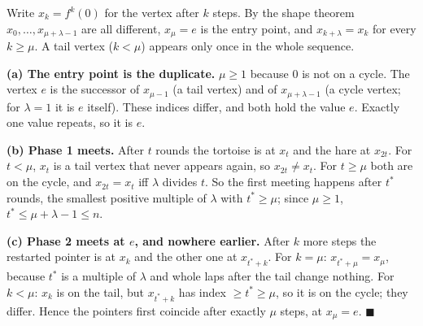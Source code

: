 \begin{invariantbox}
Write $x_k = f^k(0)$ for the vertex after $k$ steps. By the shape theorem $x_0, \dots, x_{\mu+\lambda-1}$ are all different, $x_\mu = e$ is the entry point, and $x_{k+\lambda} = x_k$ for every $k \ge \mu$. A tail vertex ($k < \mu$) appears only once in the whole sequence.

\textbf{(a) The entry point is the duplicate.} $\mu \ge 1$ because $0$ is not on a cycle. The vertex $e$ is the successor of $x_{\mu-1}$ (a tail vertex) and of $x_{\mu+\lambda-1}$ (a cycle vertex; for $\lambda = 1$ it is $e$ itself). These indices differ, and both hold the value $e$. Exactly one value repeats, so it is $e$.

\textbf{(b) Phase 1 meets.} After $t$ rounds the tortoise is at $x_t$ and the hare at $x_{2t}$. For $t < \mu$, $x_t$ is a tail vertex that never appears again, so $x_{2t} \ne x_t$. For $t \ge \mu$ both are on the cycle, and $x_{2t} = x_t$ iff $\lambda$ divides $t$. So the first meeting happens after $t^\ast$ rounds, the smallest positive multiple of $\lambda$ with $t^\ast \ge \mu$; since $\mu \ge 1$, $t^\ast \le \mu + \lambda - 1 \le n$.

\textbf{(c) Phase 2 meets at $e$, and nowhere earlier.} After $k$ more steps the restarted pointer is at $x_k$ and the other one at $x_{t^\ast + k}$. For $k = \mu$: $x_{t^\ast + \mu} = x_\mu$, because $t^\ast$ is a multiple of $\lambda$ and whole laps after the tail change nothing. For $k < \mu$: $x_k$ is on the tail, but $x_{t^\ast + k}$ has index $\ge t^\ast \ge \mu$, so it is on the cycle; they differ. Hence the pointers first coincide after exactly $\mu$ steps, at $x_\mu = e$. \hfill$\blacksquare$
\end{invariantbox}


